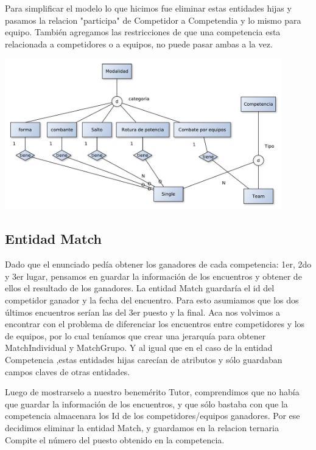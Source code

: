 Para simplificar el modelo lo que hicimos fue eliminar estas entidades hijas y pasamos la relacion "participa" de Competidor a Competendia y lo mismo para equipo. También agregamos las restricciones de que una competencia esta relacionada a competidores o a equipos, no puede pasar ambas a la vez.

\begin{center}
\includegraphics[width=12cm,keepaspectratio]{./imagenes/des1.pdf}\newline
\end{center}

\subsection{Entidad Match}

Dado que el enunciado ped\'ia obtener los ganadores de cada competencia: 1er, 2do y 3er lugar, pensamos en guardar la informaci\'on de los encuentros y obtener de ellos el resultado de los ganadores. La entidad Match guardar\'ia el id del competidor ganador y la fecha del encuentro. Para esto asumiamos que los dos \'ultimos encuentros ser\'ian las del 3er puesto y la final. Aca nos volvimos a encontrar con el problema de diferenciar los encuentros entre competidores y los de equipos, por lo cual teníamos que crear una jerarquía para obtener MatchIndividual y MatchGrupo. Y al igual que en el caso de la entidad Competencia ,estas entidades hijas carecían de atributos y s\'olo guardaban campos claves de otras entidades.

Luego de mostrarselo a nuestro benemérito Tutor, comprendimos que no había que guardar la información de los encuentros, y que s\'olo bastaba con que la competencia almacenara los Id de los competidores/equipos ganadores. Por ese decidimos eliminar la entidad Match, y guardamos en la relacion ternaria Compite el n\'umero del puesto obtenido en la competencia.

